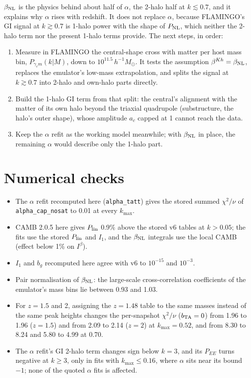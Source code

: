 \documentclass[11pt]{article}
\newcommand{\Msun}{\,h^{-1}M_\odot}
\newcommand{\Plin}{P_{\rm lin}}
\newcommand{\PNL}{P_{\rm NL}}
\newcommand{\bTA}{b_{\rm TA}}
\newcommand{\bNL}{\beta_{\rm NL}}
\newcommand{\kmax}{k_{\max}}
\newcommand{\Ib}[1]{I^{\beta}_{#1}}
\begin{document}
$\bNL$ is the physics behind about half of $\alpha$, the 2-halo half at
$k \lesssim 0.7$, and it explains why $\alpha$ rises with redshift. It does
not replace $\alpha$, because FLAMINGO's GI signal at $k \gtrsim 0.7$ is
1-halo power with the shape of $\PNL$, which neither the 2-halo term nor the
present 1-halo terms provide. The next steps, in order:
\begin{enumerate}[itemsep=1pt,topsep=2pt]
  \item Measure in FLAMINGO the central-shape cross with matter per host mass
    bin, $P_{\gamma_c m}(k|M)$, down to $10^{11.5}\Msun$. It tests the
    assumption $\beta^{Kh} = \bNL$, replaces the emulator's low-mass
    extrapolation, and splits the signal at $k \gtrsim 0.7$ into 2-halo and
    own-halo parts directly.
  \item Build the 1-halo GI term from that split: the central's alignment
    with the matter of its own halo beyond the triaxial quadrupole
    (substructure, the halo's outer shape), whose amplitude $a_c$ capped at 1
    cannot reach the data.
  \item Keep the $\alpha$ refit as the working model meanwhile; with $\bNL$
    in place, the remaining $\alpha$ would describe only the 1-halo part.
\end{enumerate}

\appendix

\section{Numerical checks}
\label{app:checks}

\begin{itemize}[itemsep=1pt,topsep=2pt]
  \item The $\alpha$ refit recomputed here (\texttt{alpha\_tatt}) gives the
    stored summed $\chi^2/\nu$ of \texttt{alpha\_cap\_nosat} to 0.01 at every
    $\kmax$.
  \item CAMB 2.0.5 here gives $\Plin$ 0.9\% above the stored v6 tables at
    $k > 0.05$; the fits use the stored $\Plin$ and $I_1$, and the $\bNL$
    integrals use the local CAMB (effect below 1\% on $\Ib{}$).
  \item $I_1$ and $b_g$ recomputed here agree with v6 to $10^{-15}$ and
    $10^{-3}$.
  \item Pair normalisation of $\bNL$: the large-scale cross-correlation
    coefficients of the emulator's mass bins lie between 0.93 and 1.03.
  \item For $z = 1.5$ and 2, assigning the $z = 1.48$ table to the same
    masses instead of the same peak heights changes the per-snapshot
    $\chi^2/\nu$ ($\bTA = 0$) from 1.96 to 1.96 ($z = 1.5$) and from 2.09 to
    2.14 ($z = 2$) at $\kmax = 0.52$, and from 8.30 to 8.24 and 5.80 to 4.99 at
    0.70.
  \item The $\alpha$ refit's GI 2-halo term changes sign below $k = 3$, and
    its $P_{EE}$ turns negative at $k \ge 3$, only in fits with
    $\kmax \le 0.16$, where $\alpha$ sits near its bound $-1$; none of the
    quoted $\alpha$ fits is affected.
\end{itemize}
\end{document}
